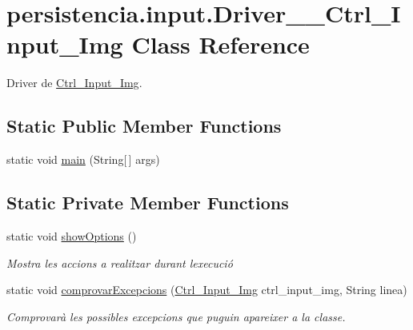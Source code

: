 \hypertarget{classpersistencia_1_1input_1_1Driver____Ctrl__Input__Img}{}\section{persistencia.\+input.\+Driver\+\_\+\+\_\+\+Ctrl\+\_\+\+Input\+\_\+\+Img Class Reference}
\label{classpersistencia_1_1input_1_1Driver____Ctrl__Input__Img}


Driver de \hyperlink{classpersistencia_1_1input_1_1Ctrl__Input__Img}{Ctrl\+\_\+\+Input\+\_\+\+Img}.  


\subsection*{Static Public Member Functions}
\begin{DoxyCompactItemize}
\item 
static void \hyperlink{classpersistencia_1_1input_1_1Driver____Ctrl__Input__Img_afe531cb182d64111aeead5d061965d8f}{main} (String\mbox{[}$\,$\mbox{]} args)
\end{DoxyCompactItemize}
\subsection*{Static Private Member Functions}
\begin{DoxyCompactItemize}
\item 
static void \hyperlink{classpersistencia_1_1input_1_1Driver____Ctrl__Input__Img_a63892d1060c96a4478541bf0feff579d}{show\+Options} ()
\begin{DoxyCompactList}\small\item\em Mostra les accions a realitzar durant l\textquotesingle{}execució \end{DoxyCompactList}\item 
static void \hyperlink{classpersistencia_1_1input_1_1Driver____Ctrl__Input__Img_a60b4011cee02b5c7fc213230db46d6e0}{comprovar\+Excepcions} (\hyperlink{classpersistencia_1_1input_1_1Ctrl__Input__Img}{Ctrl\+\_\+\+Input\+\_\+\+Img} ctrl\+\_\+input\+\_\+img, String linea)
\begin{DoxyCompactList}\small\item\em Comprovarà les possibles excepcions que puguin apareixer a la classe. \end{DoxyCompactList}\end{DoxyCompactItemize}


